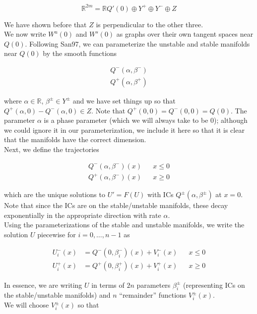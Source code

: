 \documentclass[12pt]{article}
\def\R{{\mathbb R}}
\begin{document}
\[
\R^{2m} = \R Q'(0) \oplus Y^+ \oplus Y^- \oplus Z
\]
 
We have shown before that $Z$ is perpendicular to the other three. \\

We now write $W^u(0)$ and $W^s(0)$ as graphs over their own tangent spaces near $Q(0)$. Following San97, we can parameterize the unstable and stable manifolds near $Q(0)$ by the smooth functions

\begin{align*}
Q^-(\alpha, \beta^-) \\
Q^+(\alpha, \beta^+)
\end{align*}

where $\alpha \in \R$, $\beta^\pm \in Y^\pm$ and we have set things up so that $Q^+(\alpha, 0) - Q^-(\alpha, 0) \in Z$. Note that $Q^+(0, 0) = Q^-(0, 0) = Q(0)$. The parameter $\alpha$ is a phase parameter (which we will always take to be 0); although we could ignore it in our parameterization, we include it here so that it is clear that the manifolds have the correct dimension. \\

Next, we define the trajectories

\begin{align*}
Q^-(\alpha, \beta^-)(x) && x \leq 0 \\
Q^+(\alpha, \beta^-)(x) && x \geq 0
\end{align*}

which are the unique solutions to $U' = F(U)$ with ICs $Q^\pm(\alpha, \beta^\pm)$ at $x = 0$. Note that since the ICs are on the stable/unstable manifolds, these decay exponentially in the appropriate direction with rate $\alpha$.\\

Using the parameterizations of the stable and unstable manifolds, we write the solution $U$ piecewise for $i = 0, \dots, n-1$ as

\begin{align*}
U_i^-(x) &= Q^-(0, \beta_i^-)(x) + V_i^-(x) && x \leq 0 \\
U_i^+(x) &= Q^+(0, \beta_i^+)(x) + V_i^+(x) && x \geq 0
\end{align*}

In essence, we are writing $U$ in terms of $2n$ parameters $\beta_i^\pm$ (representing ICs on the stable/unstable manifolds) and $n$ ``remainder'' functions $V_i^\pm(x)$.\\

We will choose $V_i^\pm(x)$ so that
\end{document}
